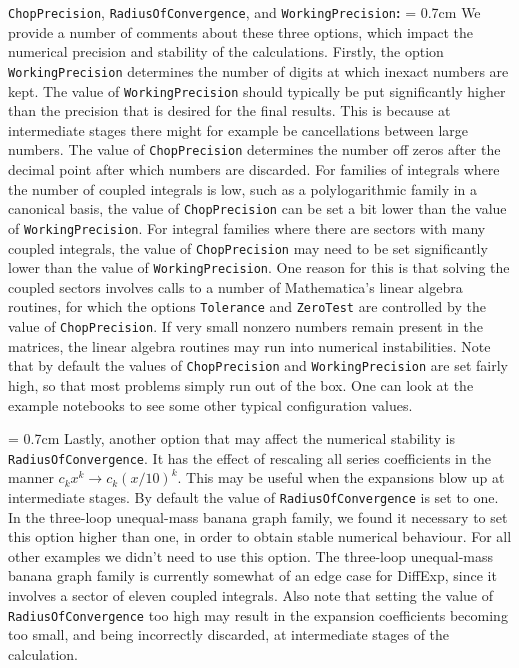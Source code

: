 \documentclass{article}
\begin{document}
{
\texttt{ChopPrecision}, \texttt{RadiusOfConvergence}, and \texttt{WorkingPrecision}{\bf : }
\parindent = 0.7cm \hangindent=0.7cm
We provide a number of comments about these three options, which impact the numerical precision and stability of the calculations. Firstly, the option \texttt{WorkingPrecision} determines the number of digits at which inexact numbers are kept. The value of \texttt{WorkingPrecision} should typically be put significantly higher than the precision that is desired for the final results. This is because at intermediate stages there might for example be cancellations between large numbers. The value of \texttt{ChopPrecision} determines the number off zeros after the decimal point after which numbers are discarded. For families of integrals where the number of coupled integrals is low, such as a polylogarithmic family in a canonical basis, the value of \texttt{ChopPrecision} can be set a bit lower than the value of \texttt{WorkingPrecision}. For integral families where there are sectors with many coupled integrals, the value of \texttt{ChopPrecision} may need to be set significantly lower than the value of \texttt{WorkingPrecision}. One reason for this is that solving the coupled sectors involves calls to a number of Mathematica's linear algebra routines, for which the options \texttt{Tolerance} and \texttt{ZeroTest} are controlled by the value of \texttt{ChopPrecision}. If very small nonzero numbers remain present in the matrices, the linear algebra routines may run into numerical instabilities. Note that by default the values of \texttt{ChopPrecision} and \texttt{WorkingPrecision} are set fairly high, so that most problems simply run out of the box. One can look at the example notebooks to see some other typical configuration values.

\parindent = 0.7cm \hangindent=0.7cm
Lastly, another option that may affect the numerical stability is \texttt{RadiusOfConvergence}. It has the effect of rescaling all series coefficients in the manner $c_k x^k \rightarrow c_k (x/10)^k$. This may be useful when the expansions blow up at intermediate stages. By default the value of \texttt{RadiusOfConvergence} is set to one. In the three-loop unequal-mass banana graph family, we found it necessary to set this option higher than one, in order to obtain stable numerical behaviour. For all other examples we didn't need to use this option. The three-loop unequal-mass banana graph family is currently somewhat of an edge case for DiffExp, since it involves a sector of eleven coupled integrals. Also note that setting the value of \texttt{RadiusOfConvergence} too high may result in the expansion coefficients becoming too small, and being incorrectly discarded, at intermediate stages of the calculation.

}
\end{document}
